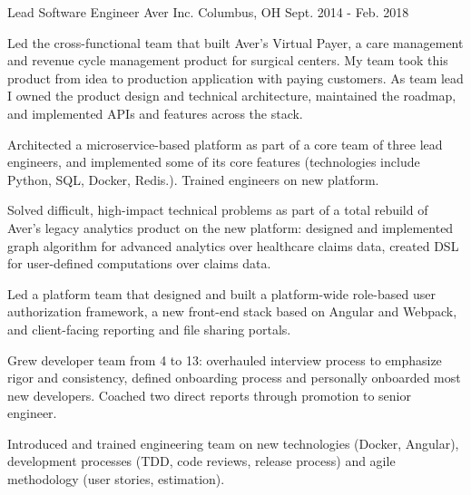 

\begin{cventries}

  \cventry
    {Lead Software Engineer} %
    {Aver Inc.} %
    {Columbus, OH} %
    {Sept. 2014 - Feb. 2018} %
    {
      \begin{cvitems} %
        \item {Led the cross-functional team that built Aver's Virtual Payer, a care management and revenue cycle management product for surgical centers.
        My team took this product from idea to production application with paying customers.
        As team lead I owned the product design and technical architecture, maintained the roadmap, and implemented APIs and features across the stack.}
        \item {Architected a microservice-based platform as part of a core team of three lead engineers, and implemented some of its core features (technologies include Python, SQL, Docker, Redis.).
        Trained engineers on new platform.}
        \item {Solved difficult, high-impact technical problems as part of a total rebuild of Aver's legacy analytics product on the new platform: designed and implemented graph algorithm for advanced analytics over healthcare claims data, created DSL for user-defined computations over claims data.}
        \item {Led a platform team that designed and built a platform-wide role-based user authorization framework, a new front-end stack based on Angular and Webpack, and client-facing reporting and file sharing portals.}
        \item {Grew developer team from 4 to 13: overhauled interview process to emphasize rigor and consistency, defined onboarding process and personally onboarded most new developers. Coached two direct reports through promotion to senior engineer.}
        \item {Introduced and trained engineering team on new technologies (Docker, Angular), development processes (TDD, code reviews, release process) and agile methodology (user stories, estimation).}
      \end{cvitems}
    }


\end{cventries}

